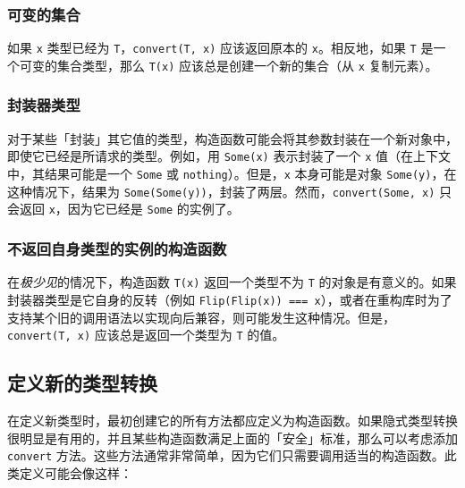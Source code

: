 \subsubsection{可变的集合}



如果 \texttt{x} 类型已经为 \texttt{T}，\texttt{convert(T, x)} 应该返回原本的 \texttt{x}。相反地，如果 \texttt{T} 是一个可变的集合类型，那么 \texttt{T(x)} 应该总是创建一个新的集合（从 \texttt{x} 复制元素）。



\hypertarget{13864114731640700485}{}


\subsubsection{封装器类型}



对于某些「封装」其它值的类型，构造函数可能会将其参数封装在一个新对象中，即使它已经是所请求的类型。例如，用 \texttt{Some(x)} 表示封装了一个 \texttt{x} 值（在上下文中，其结果可能是一个 \texttt{Some} 或 \texttt{nothing}）。但是，\texttt{x} 本身可能是对象 \texttt{Some(y)}，在这种情况下，结果为 \texttt{Some(Some(y))}，封装了两层。然而，\texttt{convert(Some, x)} 只会返回 \texttt{x}，因为它已经是 \texttt{Some} 的实例了。



\hypertarget{1440871335026577968}{}


\subsubsection{不返回自身类型的实例的构造函数}



在\emph{极少见}的情况下，构造函数 \texttt{T(x)} 返回一个类型不为 \texttt{T} 的对象是有意义的。如果封装器类型是它自身的反转（例如 \texttt{Flip(Flip(x)) === x}），或者在重构库时为了支持某个旧的调用语法以实现向后兼容，则可能发生这种情况。但是，\texttt{convert(T, x)} 应该总是返回一个类型为 \texttt{T} 的值。



\hypertarget{16585115796165922811}{}


\subsection{定义新的类型转换}



在定义新类型时，最初创建它的所有方法都应定义为构造函数。如果隐式类型转换很明显是有用的，并且某些构造函数满足上面的「安全」标准，那么可以考虑添加 \texttt{convert} 方法。这些方法通常非常简单，因为它们只需要调用适当的构造函数。此类定义可能会像这样：




